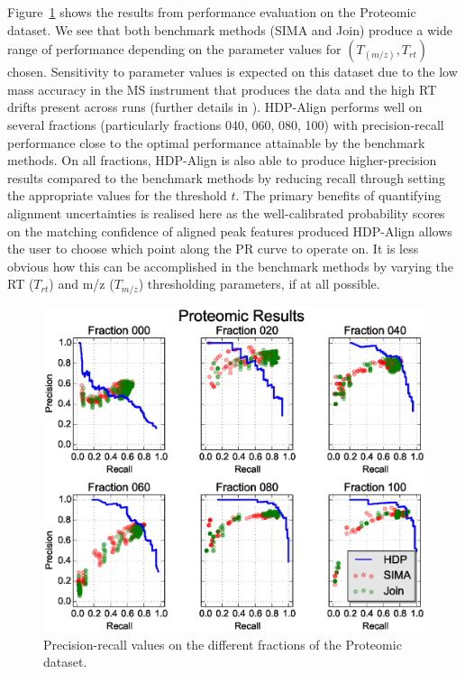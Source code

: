 Figure~\ref{fig:proteomic_results} shows the results from performance evaluation on the Proteomic dataset. We see that both benchmark methods (SIMA and Join) produce a wide range of performance depending on the parameter values for $(T_{(m/z)}, T_{rt})$ chosen. Sensitivity to parameter values is expected on this dataset due to the low mass accuracy in the MS instrument that produces the data and the high \ac{RT} drifts present across runs (further details in \cite{Lange2008}). HDP-Align performs well on several fractions (particularly fractions 040, 060, 080, 100) with precision-recall performance close to the optimal performance attainable by the benchmark methods. On all fractions, HDP-Align is also able to produce higher-precision results compared to the benchmark methods by reducing recall through setting the appropriate values for the threshold $t$. The primary benefits of quantifying alignment uncertainties is realised here as the well-calibrated probability scores on the matching confidence of aligned peak features produced HDP-Align allows the user to choose which point along the PR curve to operate on. It is less obvious how this can be accomplished in the benchmark methods by varying the \ac{RT} ($T_{rt}$) and m/z ($T_{m/z}$) thresholding parameters, if at all possible.

\begin{figure}
\centering\includegraphics[width=1\columnwidth]{05-hdp/figures/figure_4.eps}
\centering\caption{\label{fig:proteomic_results}Precision-recall values on the different fractions of the Proteomic dataset.}
\end{figure}

